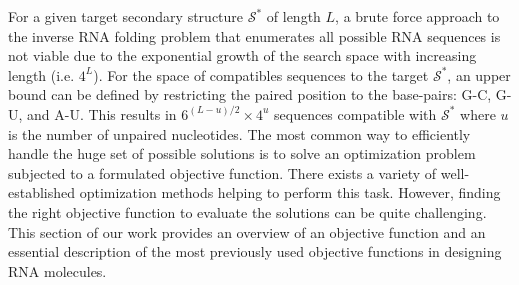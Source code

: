 
For a given target secondary structure $\mathcal{S}^*$ of length $L$, a brute force approach to the inverse \ac{RNA} folding problem that enumerates all possible \ac{RNA} sequences is not viable due to the exponential growth of the search space with increasing length (i.e. $4^L$). For the space of compatibles sequences to the target $\mathcal{S}^*$, an upper bound can be defined by restricting the paired position to the base-pairs: G-C, G-U, and A-U. This results in $6^{(L-u)/2} \times 4^u$ sequences compatible with $\mathcal{S}^*$ where $u$ is the number of unpaired nucleotides. The most common way to efficiently handle the huge set of possible solutions is to solve an optimization problem subjected to a formulated objective function. There exists a variety of well-established optimization methods helping to perform this task. However, finding the right objective function to evaluate the solutions can be quite challenging. This section of our work provides an overview of an objective function and an essential description of the most previously used objective functions in designing \ac{RNA} molecules.

